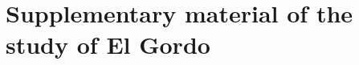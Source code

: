
\doublespacing
\chapter{Supplementary material of the study of El Gordo}{}{}
\label{appendix1}

				 
% 
